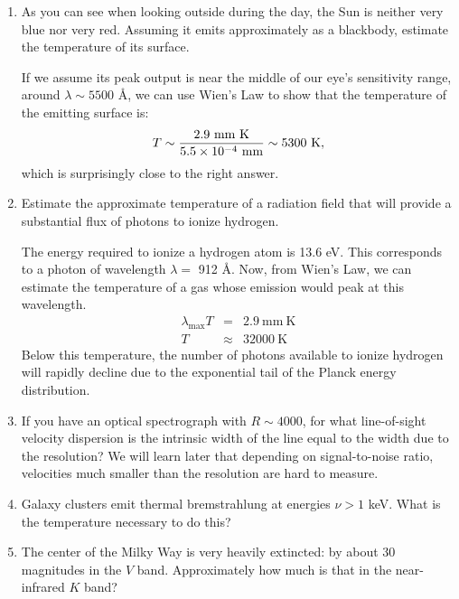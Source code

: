 \begin{enumerate} 
\item As you can see when looking outside during the day, the Sun is
    neither very blue nor very red. Assuming it emits approximately as
    a blackbody, estimate the temperature of its surface.

\begin{answer}
If we assume its peak output is near the middle of our eye's
sensitivity range, around $\lambda \sim 5500$ \AA, we can use Wien's
Law to show that the temperature of the emitting surface is:
\begin{equation}
T \sim \frac{2.9 {\rm ~mm~K}}{5.5 \times 10^{-4} {\rm ~mm}} \sim 5300
{\rm ~K},
\end{equation}
which is surprisingly close to the right answer.
\end{answer}

\item Estimate the approximate temperature of a radiation field that
    will provide a substantial flux of photons to ionize hydrogen.

\begin{answer}
The energy required to ionize a hydrogen atom
is 13.6 eV. This corresponds to a photon of
wavelength $\lambda = $ 912 \AA. Now, from Wien's Law, we
can estimate the temperature of a gas whose emission would peak at
this wavelength.
\begin{eqnarray} 
\lambda_\textrm{max}T&=& 2.9\mathrm{~mm~K}\\
T&\approx& 32000 \mathrm{~K}
\end{eqnarray}
Below this temperature, the number of photons available to ionize
hydrogen will rapidly decline due to the exponential tail of the
Planck energy distribution.
\end{answer}

\item If you have an optical spectrograph with $R\sim 4000$, for what
line-of-sight velocity dispersion is the intrinsic width of the line
equal to the width due to the resolution?  We will learn later that
depending on signal-to-noise ratio, velocities much smaller than the
resolution are hard to measure.

\item Galaxy clusters emit thermal bremstrahlung at energies $\nu > 1$
keV. What is the temperature necessary to do this? 

\item The center of the Milky Way is very heavily extincted: by about
    30 magnitudes in the $V$ band. Approximately how much is that in
    the near-infrared $K$ band?


\end{enumerate}
